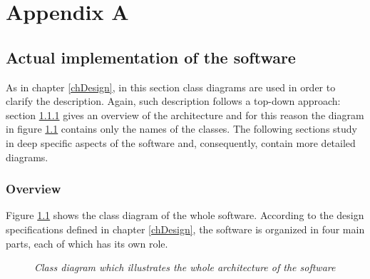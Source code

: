 \appendix
\chapter{Appendix A}\label{appA}
	
	\section{Actual implementation of the software}
	As in chapter \ref{chDesign}, in this section class diagrams are used in order to clarify the description. Again, such description follows a top-down approach: section \ref{impl_arch} gives an overview of the architecture and for this reason the diagram in figure \ref{fig:implementation_names} contains only the names of the classes. The following sections study in deep specific aspects of the software and, consequently, contain more detailed diagrams.


		\subsection{Overview}\label{impl_arch}
		Figure \ref{fig:implementation_names} shows the class diagram of the whole software. 
		According to the design specifications defined in chapter \ref{chDesign}, the software is organized in four main parts, each of which has its own role.

		\begin{figure}[h]
		  \begin{center} 
		  \end{center} 
		  \caption{\textit{Class diagram which illustrates the whole architecture of the software}}  
		  \label{fig:implementation_names}
	 	\end{figure}
 
